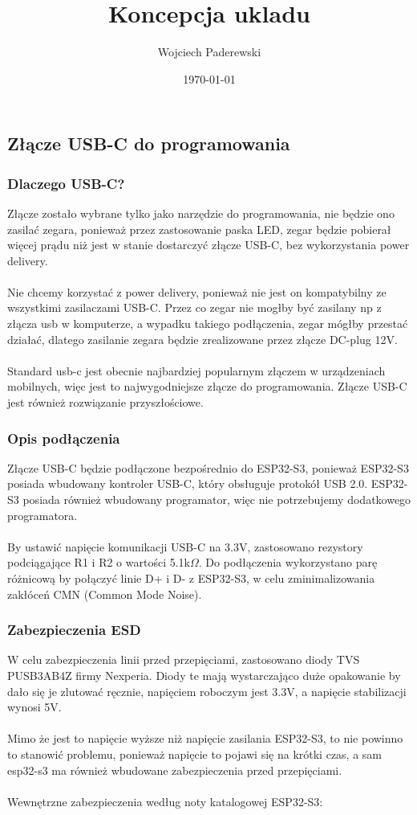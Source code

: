 \documentclass[../../main.tex]{subfiles}
\author{Wojciech Paderewski}
\date{\today}
\title{Koncepcja ukladu}
\begin{document}
\subsection{Złącze USB-C do programowania}
\subsubsection{Dlaczego USB-C?}
Złącze zostało wybrane tylko jako narzędzie do programowania, nie będzie ono zasilać zegara, ponieważ przez zastosowanie paska LED, zegar będzie pobierał więcej prądu niż jest w stanie dostarczyć złącze USB-C, 
bez wykorzystania power delivery.
\\\\
Nie chcemy korzystać z power delivery, ponieważ nie jest on kompatybilny ze wszystkimi zasilaczami USB-C. Przez co zegar nie mogłby być zasilany np z złącza usb w komputerze,
a wypadku takiego podłączenia, zegar mógłby przestać działać, dlatego zasilanie zegara będzie zrealizowane przez złącze DC-plug 12V. 
\\\\
Standard usb-c jest obecnie najbardziej popularnym złączem w urządzeniach mobilnych,
więc jest to najwygodniejsze złącze do programowania. Złącze USB-C jest również rozwiązanie przyszłościowe.

\subsubsection{Opis podłączenia}
Złącze USB-C będzie podłączone bezpośrednio do ESP32-S3, ponieważ ESP32-S3 posiada wbudowany kontroler USB-C, 
który obsługuje protokół USB 2.0. ESP32-S3 posiada również wbudowany programator, więc nie potrzebujemy dodatkowego programatora.
\\\\
By ustawić napięcie komunikacji USB-C na 3.3V, zastosowano rezystory podciągające R1 i R2 o wartości 5.1k$\Omega$.
Do podłączenia wykorzystano parę różnicową by połączyć linie D+ i D- z ESP32-S3, w celu zminimalizowania zakłóceń CMN (Common Mode Noise).

\subsubsection{Zabezpieczenia ESD}

W celu zabezpieczenia linii przed przepięciami, zastosowano diody TVS PUSB3AB4Z firmy Nexperia. Diody te mają wystarczająco duże opakowanie by dało się je zlutować ręcznie, napięciem roboczym jest 3.3V,
a napięcie stabilizacji wynosi 5V. 
\\\\
Mimo że jest to napięcie wyższe niż napięcie zasilania ESP32-S3, to nie powinno to stanowić problemu, 
ponieważ napięcie to pojawi się na krótki czas, a sam esp32-s3 ma również wbudowane zabezpieczenia przed przepięciami.
\\\\
Wewnętrzne zabezpieczenia według noty katalogowej ESP32-S3:
\end{document}
